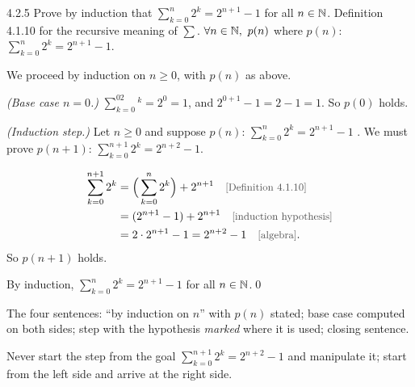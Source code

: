 \begin{bookex}[essential]{4.2.5}
Prove by induction that $\displaystyle\sum_{k=0}^n2^k=2^{n+1}-1$ for all $n\in\mathbb{N}$.
\solution
\given Definition 4.1.10 for the recursive meaning of $\sum$.
\goal $\forall n\in\mathbb{N},\ p(n)$ where $p(n)$: $\sum_{k=0}^n2^k=2^{n+1}-1$.
\begin{steps}
\item We proceed by induction on $n\ge0$, with $p(n)$ as above.
\item \emph{(Base case $n=0$.)} $\sum_{k=0}^02^k=2^0=1$, and $2^{0+1}-1=2-1=1$. So $p(0)$ holds.
\item \emph{(Induction step.)} Let $n\ge0$ and suppose $p(n)$: $\sum_{k=0}^n2^k=2^{n+1}-1$ . We must prove $p(n+1)$: $\sum_{k=0}^{n+1}2^k=2^{n+2}-1$.
\item
\begin{align*}
\sum_{k=0}^{n+1}2^k&=\Big(\sum_{k=0}^n2^k\Big)+2^{n+1}\why{Definition 4.1.10}\\
&=(2^{n+1}-1)+2^{n+1}\why{induction hypothesis}\\
&=2\cdot2^{n+1}-1=2^{n+2}-1\why{algebra}.
\end{align*}
So $p(n+1)$ holds.
\end{steps}
\conclusion By induction, $\sum_{k=0}^n2^k=2^{n+1}-1$ for all $n\in\mathbb{N}$.\qed
\begin{compare}
\item The four sentences: ``by induction on $n$'' with $p(n)$ stated; base case computed on both sides; step with the hypothesis \emph{marked} where it is used; closing sentence.
\item Never start the step from the goal $\sum_{k=0}^{n+1}2^k=2^{n+2}-1$ and manipulate it; start from the left side and arrive at the right side.
\end{compare}
\end{bookex}

